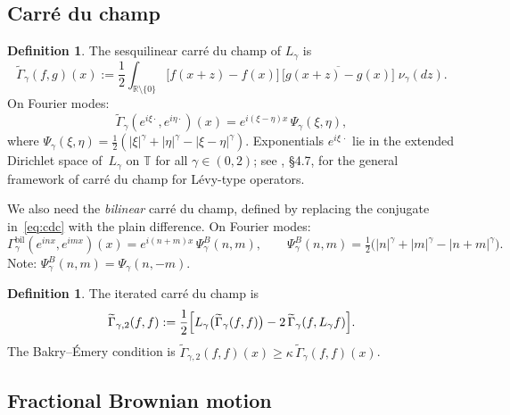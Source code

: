 \documentclass[11pt,a4paper]{article}
\theoremstyle{plain}
\theoremstyle{definition}
\newtheorem{definition}[theorem]{Definition}
\theoremstyle{remark}
\newcommand{\R}{\mathbb{R}}
\newcommand{\T}{\mathbb{T}}
\begin{document}
\subsection{Carr\'e du champ}

\begin{definition}\label{def:cdc}
The sesquilinear carr\'e du champ of $L_\gamma$ is
\begin{equation}\label{eq:cdc}
  \widetilde{\Gamma}_\gamma(f,g)(x)
  := \frac{1}{2} \int_{\R \setminus \{0\}}
  \bigl[f(x+z) - f(x)\bigr]\,
  \overline{\bigl[g(x+z) - g(x)\bigr]}\;
  \nu_\gamma(dz).
\end{equation}
On Fourier modes:
\begin{equation}\label{eq:psi-kernel}
  \widetilde{\Gamma}_\gamma(e^{i\xi\cdot}, e^{i\eta\cdot})(x)
  = e^{i(\xi-\eta)x}\,\Psi_\gamma(\xi,\eta),
\end{equation}
where $\Psi_\gamma(\xi,\eta)
= \tfrac{1}{2}(|\xi|^\gamma + |\eta|^\gamma - |\xi-\eta|^\gamma)$.
Exponentials $e^{i\xi\,\cdot}$ lie in the extended Dirichlet space
of~$L_\gamma$ on $\T$ for all $\gamma \in (0,2)$; see
\cite{BoettcherSchillingWang2013}, \S4.7, for the general framework
of carr\'e du champ for L\'evy-type operators.
\end{definition}

We also need the \emph{bilinear} carr\'e du champ, defined by replacing
the conjugate in~\eqref{eq:cdc} with the plain difference. On Fourier modes:
\begin{equation}\label{eq:psi-bilinear}
  \Gamma_\gamma^{\mathrm{bil}}(e^{inx}, e^{imx})(x)
  = e^{i(n+m)x}\,\Psi_\gamma^B(n,m),
  \qquad
  \Psi_\gamma^B(n,m) = \tfrac{1}{2}\bigl(|n|^\gamma + |m|^\gamma
  - |n+m|^\gamma\bigr).
\end{equation}
Note: $\Psi_\gamma^B(n,m) = \Psi_\gamma(n,-m)$.

\begin{definition}\label{def:gamma2}
The iterated carr\'e du champ is
\begin{equation}\label{eq:gamma2-def}
  \widetilde{\Gamma}_{\gamma,2}(f,f)
  := \frac{1}{2}\Bigl[
    L_\gamma\bigl(\widetilde{\Gamma}_\gamma(f,f)\bigr)
    - 2\,\widetilde{\Gamma}_\gamma(f, L_\gamma f)
  \Bigr].
\end{equation}
The Bakry--\'Emery condition is
$\widetilde{\Gamma}_{\gamma,2}(f,f)(x) \geq \kappa\,
\widetilde{\Gamma}_\gamma(f,f)(x)$.
\end{definition}


\subsection{Fractional Brownian motion}
\end{document}
